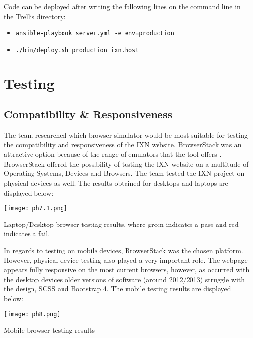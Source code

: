\documentclass[fontsize=11pt]{extarticle}
\numberwithin{figure}{section} %
\numberwithin{table}{section}%
\providecommand{\tightlist}{%
  \setlength{\itemsep}{0pt}\setlength{\parskip}{0pt}}
\begin{document}
Code can be deployed after writing the following lines on the command
line in the Trellis directory:

\begin{itemize}
\tightlist
\item
  \texttt{ansible-playbook\ server.yml\ -e\ env=production}
\item
  \texttt{./bin/deploy.sh\ production\ ixn.host}
\end{itemize}

\newpage

\hypertarget{testing}{%
\section{Testing}\label{testing}}

\hypertarget{compatibility-responsiveness}{%
\subsection{Compatibility \&
Responsiveness}\label{compatibility-responsiveness}}

The team researched which browser simulator would be most suitable for
testing the compatibility and responsiveness of the IXN website.
BrowserStack was an attractive option because of the range of emulators
that the tool offers \cite{g6}. BrowserStack offered the possibility of
testing the IXN website on a multitude of Operating Systems, Devices and
Browsers. The team tested the IXN project on physical devices as well.
The results obtained for desktops and laptops are displayed below:

\begin{table}[H]
      \centering
      \texttt{[image: ph7.1.png]}
      \caption{Laptop/Desktop browser testing results, where green indicates a pass and red indicates a fail.}
 \end{table}

In regards to testing on mobile devices, BrowserStack was the chosen
platform. However, physical device testing also played a very important
role. The webpage appears fully responsive on the most current browsers,
however, as occurred with the desktop devices older versions of software
(around 2012/2013) struggle with the design, SCSS and Bootstrap 4. The
mobile testing results are displayed below:

\begin{table}[H]
      \centering
      \texttt{[image: ph8.png]}
      \caption{Mobile browser testing results}
 \end{table}
\end{document}
